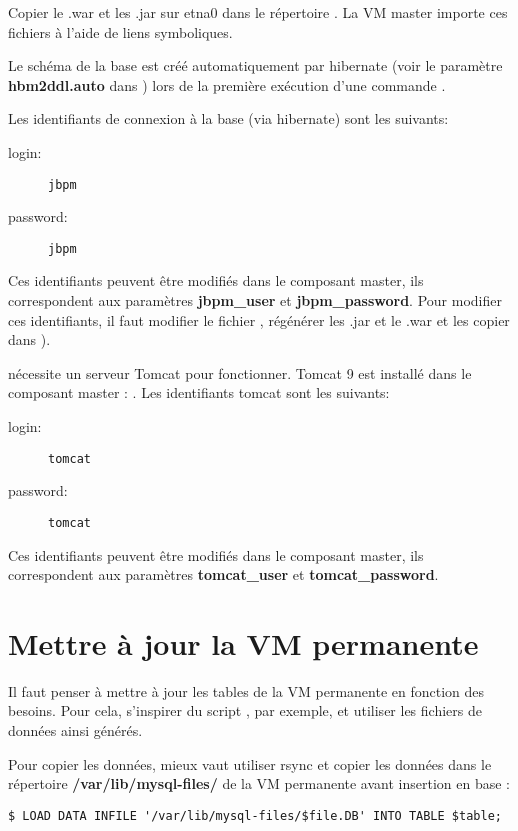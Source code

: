 Copier le .war et les .jar sur etna0 dans le répertoire .
La VM master importe ces fichiers à l'aide de liens symboliques.
\newline

Le schéma de la base  est créé automatiquement par hibernate (voir le paramètre \textbf{hbm2ddl.auto} dans ) lors de la première exécution d'une commande .
\newline

Les identifiants de connexion à la base  (via hibernate) sont les suivants:
\begin{description}
    \item[login:] \texttt{jbpm}
    \item[password:] \texttt{jbpm}
\end{description}
Ces identifiants peuvent être modifiés dans le composant master, ils correspondent aux paramètres \textbf{jbpm\_user} et \textbf{jbpm\_password}.
Pour modifier ces identifiants, il faut modifier le fichier , régénérer les .jar et le .war et les copier dans ).
\newline

 nécessite un serveur Tomcat pour fonctionner.
Tomcat 9 est installé dans le composant master : .
Les identifiants tomcat sont les suivants:
\begin{description}
    \item[login:] \texttt{tomcat}
    \item[password:] \texttt{tomcat}
\end{description}
Ces identifiants peuvent être modifiés dans le composant master, ils correspondent aux paramètres \textbf{tomcat\_user} et \textbf{tomcat\_password}.

\section{Mettre à jour la VM permanente}

Il faut penser à mettre à jour les tables de la VM permanente en fonction des besoins. Pour cela, s'inspirer du script , par exemple, et utiliser les fichiers de données ainsi générés.
\bigskip

Pour copier les données, mieux vaut utiliser rsync et copier les données dans le répertoire \textbf{/var/lib/mysql-files/} de la VM permanente avant insertion en base :
\begin{lstlisting}[style=bash]
$ LOAD DATA INFILE '/var/lib/mysql-files/$file.DB' INTO TABLE $table;
\end{lstlisting}
